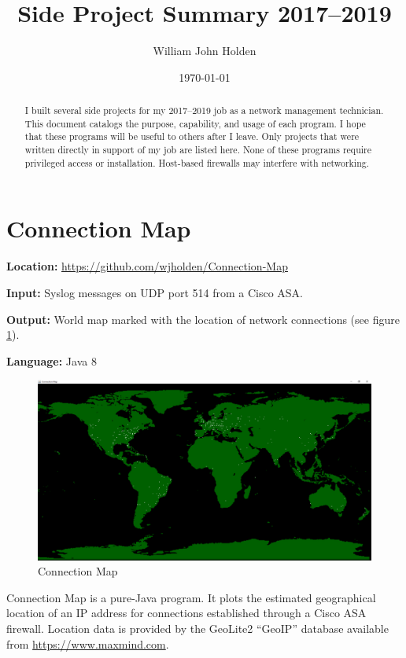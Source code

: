 \documentclass[12pt]{article}
\title{Side Project Summary 2017--2019}
\author{William John Holden}
\date{\today}
\begin{document}
\maketitle

\begin{abstract}
I built several side projects for my 2017--2019 job as a network management technician.
This document catalogs the purpose, capability, and usage of each program.
I hope that these programs will be useful to others after I leave.
Only projects that were written directly in support of my job are listed here.
None of these programs require privileged access or installation.
Host-based firewalls may interfere with networking.
\end{abstract}


\section{Connection Map} \label{sec:ConnectionMap}

\noindent \textbf{Location:} \url{https://github.com/wjholden/Connection-Map}

\noindent \textbf{Input:} Syslog messages on UDP port 514 from a Cisco ASA.

\noindent \textbf{Output:} World map marked with the location of network connections (see figure \ref{fig:connection-map}).

\noindent \textbf{Language:} Java 8

\begin{figure}[h]
\centering
\includegraphics[width=.80\textwidth]{Connection-Map}
\caption{Connection Map}
\label{fig:connection-map}
\end{figure}

Connection Map is a pure-Java program.
It plots the estimated geographical location of an IP address for connections established through a Cisco ASA firewall.
Location data is provided by the GeoLite2 ``GeoIP'' database available from \url{https://www.maxmind.com}.
\end{document}
